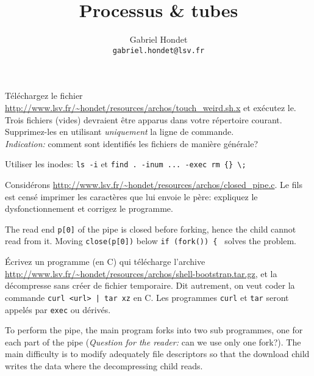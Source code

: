 \documentclass{exam}
\title{Processus \& tubes}
\author{Gabriel Hondet\\\texttt{gabriel.hondet@lsv.fr}}
\begin{document}
\maketitle

\begin{questions}
  Téléchargez le fichier
  \url{http://www.lsv.fr/~hondet/resources/archos/touch_weird.sh.x} et exécutez
  le.
  Trois fichiers (vides) devraient être apparus dans votre répertoire courant.
  Supprimez-les en utilisant \emph{uniquement} la ligne de commande.\\
  \emph{Indication:} comment sont identifiés les fichiers de manière générale?

  \begin{solution}
    Utiliser les inodes: \verb|ls -i| et \verb|find . -inum ... -exec rm {} \;|
  \end{solution}

Considérons
\url{http://www.lsv.fr/~hondet/resources/archos/closed_pipe.c}.
Le fils est censé imprimer les caractères que lui envoie le père: expliquez le
dysfonctionnement et corrigez le programme.

\begin{solution}
  The read end \texttt{p[0]} of the pipe is closed before forking, hence the
  child cannot read from it. Moving \verb|close(p[0])| below
  \verb|if (fork()) { | solves the problem.
\end{solution}

Écrivez un programme (en C) qui télécharge l'archive
\url{http://www.lsv.fr/~hondet/resources/archos/shell-bootstrap.tar.gz},
et la décompresse sans créer de fichier temporaire. Dit autrement, on veut
coder la commande \verb+curl <url> | tar xz+ en C. Les programmes \verb+curl+
et \verb+tar+ seront appelés par \verb+exec+ ou dérivés.

\begin{solution}
  To perform the pipe, the main program forks into two sub programmes, one
  for each part of the pipe (\textit{Question for the reader:} can we use only
  one fork?). The main difficulty is to modify adequately file descriptors so
  that the download child writes the data where the decompressing child reads.
  \inputminted{C}{download.c}
\end{solution}


\end{questions}
\end{document}
